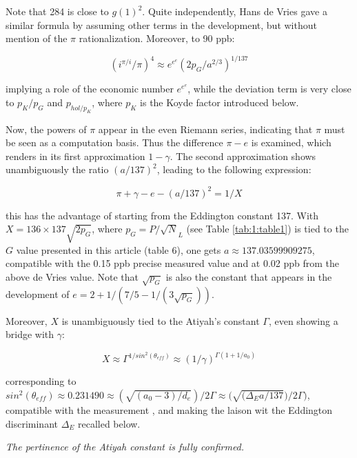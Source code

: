 \documentclass[a4paper,9pt]{article}
\begin{document}
Note that 284 is close to $g(1)^2$. Quite independently, Hans de Vries \cite{deVries} gave a similar formula by assuming other terms in the development, but without mention of the $\pi$ rationalization. Moreover, to 90 ppb:

\begin{equation}
(i^{\pi/i}/\pi)^4 \approx e^{e^e} (2p_G/a^{2/3})^{1/137}
\end{equation}

implying a role of the economic number $e^{e^e}$, while the deviation term is very close to $p_K/p_G$ and $p_{hol/p_K}$, where $p_K$ is the Koyde factor introduced below.

Now, the powers of $\pi $ appear in the even Riemann series, indicating that $\pi$ must be seen as a computation basis. Thus the difference $\pi - e$ is examined, which renders in its first approximation $ 1-\gamma$. The second approximation shows unambiguously the ratio $(a/137)^2$, leading to the following expression:

     
\begin{equation}
\pi+ \gamma - e - (a/137)^2 = 1/X
\end{equation}    

this has the advantage of starting from the Eddington constant  137. With $X = 136 \times 137 \sqrt{2p_G}$, where $p_G = P/\sqrt N_L$ (see Table \ref{tab:1:table1}) is tied to the $G$ value presented in this article (table 6), one gets $a \approx 137.03599909275 $, compatible with the 0.15 ppb precise measured value and at 0.02 ppb from the above de Vries value. Note that $\sqrt {p_G} $ is also the constant that appears in the development of $e = 2 + 1/(7/5 -1/(3\sqrt {p_G}))$.


Moreover, $X$ is unambiguously tied to the Atiyah's constant $\Gamma$, even showing a bridge with $\gamma$:

\begin{equation}
X \approx \Gamma ^{1/sin^2(\theta_{eff})} \approx (1/\gamma)^{\Gamma (1+1/a_0)}
\end{equation}  

corresponding to $ sin^2(\theta_{eff})\approx 0.231490 \approx (\sqrt{(a_0 -3)/d_e})/2\Gamma \approx \bigg(\sqrt{(\Delta_E a/137})/2\Gamma\bigg)$, compatible with the measurement \cite{Tanabashi}, and making the laison wit the Eddington discriminant $\Delta_E$ recalled below. 


\textit{The pertinence of the Atiyah constant is fully confirmed.}
\end{document}
